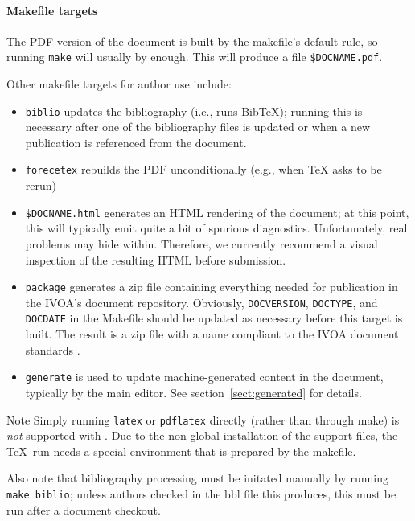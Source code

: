 \documentclass[11pt,a4paper]{ivoa}
\newcommand{\BibTeX}{BibTeX}
\begin{document}
\paragraph{Makefile targets}

The PDF version of the document is built by the makefile's default rule,
so running \texttt{make} will usually by enough.  This will produce a
file \texttt{\$DOCNAME.pdf}.

Other makefile targets for author use include:

\begin{itemize}
\item \texttt{biblio} updates the bibliography (i.e., runs \BibTeX);
running this is necessary after one of the bibliography files is updated
or when a new publication is referenced from the document.
\item \texttt{forecetex} rebuilds the PDF unconditionally (e.g., when TeX
asks to be rerun)
\item \texttt{\$DOCNAME.html} generates an HTML rendering of the
document; at this point, this will typically emit quite a bit of
spurious diagnostics.  Unfortunately, real problems may hide within.  
Therefore, we currently recommend a visual inspection of the resulting
HTML before submission.
\item \texttt{package} generates a zip file containing everything needed
for publication in the IVOA's document repository.   Obviously, 
\texttt{DOCVERSION}, \texttt{DOCTYPE}, and \texttt{DOCDATE} in the
Makefile should be updated as necessary before this target is built.
The result is a zip file with a name compliant to the IVOA document
standards \citep{std:docSTD}.
\item \texttt{generate} is used to update machine-generated content in
the document, typically by the main editor.  See
section~\ref{sect:generated} for details.
\end{itemize}

\begin{admonition}{Note}
Simply running \texttt{latex} or \texttt{pdflatex} directly
(rather than through make) is \emph{not} supported with \ivoatex.  Due
to the non-global installation of the support files, the \TeX\ run needs
a special environment that is prepared by the makefile.

Also note that bibliography processing must be initated manually by
running \texttt{make biblio}; unless authors checked in the bbl file
this produces, this must be run after a document checkout.
\end{admonition}
\end{document}

